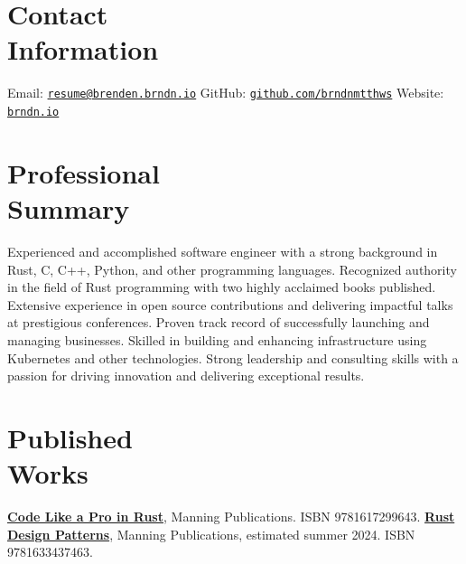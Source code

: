 \documentclass[margin,line]{resume}
\begin{document}
 
\begin{resume}

\section{\mysidestyle Contact\\Information}

Email: \href{mailto:resume@brenden.brndn.io}{\texttt{resume@brenden.brndn.io}} \hfill
GitHub: \href{https://github.com/brndnmtthws}{\texttt{github.com/brndnmtthws}} \hfill
Website: \href{https://brndn.io}{\texttt{brndn.io}} \hfill
\vspace{3mm}

\section{\mysidestyle Professional\\Summary}

Experienced and accomplished software engineer with a strong background in Rust, C, C++, Python, and other programming languages. Recognized authority in the field of Rust programming with two highly acclaimed books published. Extensive experience in open source contributions and delivering impactful talks at prestigious conferences. Proven track record of successfully launching and managing businesses. Skilled in building and enhancing infrastructure using Kubernetes and other technologies. Strong leadership and consulting skills with a passion for driving innovation and delivering exceptional results.

\section{\mysidestyle Published\\Works}

\href{https://www.manning.com/books/code-like-a-pro-in-rust}{\textbf{Code Like a Pro in Rust}}, Manning Publications. ISBN 9781617299643.
\linebreak \href{https://www.manning.com/books/rust-design-patterns}{\textbf{Rust Design Patterns}}, Manning Publications,
estimated summer 2024. ISBN 9781633437463.


\end{resume}
\end{document}
